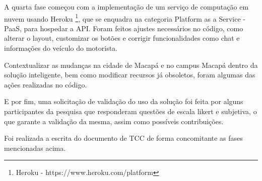 A quarta fase começou com a implementação de um serviço de computação em nuvem usando Heroku \footnote{Heroku - https://www.heroku.com/platform}, que se enquadra na categoria Platform as a Service - PaaS, para hospedar a API. Foram feitos ajustes necessários no código, como alterar o layout, customizar os botões e corrigir funcionalidades como chat e informações do veículo do motorista.

Contextualizar as mudanças na cidade de Macapá e no campus Macapá dentro da solução inteligente, bem como modificar recursos já obsoletos, foram algumas das ações realizadas no código.

E por fim, uma solicitação de validação do uso da solução foi feita por alguns participantes da pesquisa que responderam questões de escala likert e subjetiva, o que garante a validação da mesma, assim como possíveis contribuições.

Foi realizada a escrita do documento de TCC de forma concomitante as fases mencionadas acima.